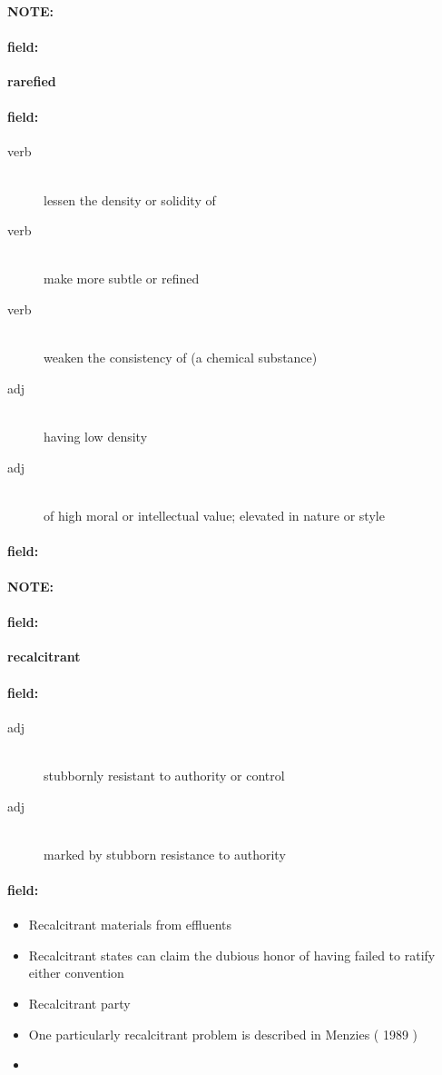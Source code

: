 \documentclass[12pt]{article}
\newenvironment{note}{\paragraph{NOTE:}}{}
\newenvironment{field}{\paragraph{field:}}{}
\begin{document}
\begin{note}
\begin{field}
\textbf{\large rarefied}
\end{field}


\begin{field}
\begin{description}
\item[verb] \hfill \\ 
lessen the density or solidity of

\item[verb] \hfill \\ 
make more subtle or refined

\item[verb] \hfill \\ 
weaken the consistency of (a chemical substance)

\item[adj] \hfill \\ 
having low density

\item[adj] \hfill \\ 
of high moral or intellectual value; elevated in nature or style

\end{description}
\end{field}

\begin{field}
\end{field}
\end{note}
\begin{note}
\begin{field}
\textbf{\large recalcitrant}
\end{field}


\begin{field}
\begin{description}
\item[adj] \hfill \\ 
stubbornly resistant to authority or control

\item[adj] \hfill \\ 
marked by stubborn resistance to authority

\end{description}
\end{field}

\begin{field}
\begin{itemize}
\item Recalcitrant materials from effluents
\item Recalcitrant states can claim the dubious honor of having failed to ratify either convention
\item Recalcitrant party
\item One particularly recalcitrant problem is described in Menzies ( 1989 )
\item 
\end{itemize}
\end{field}
\end{note}
\end{document}
